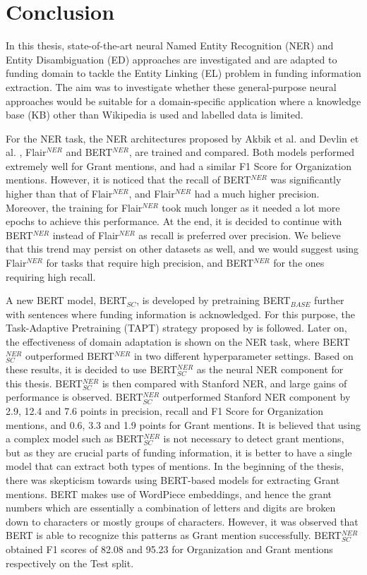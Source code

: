 \documentclass{report}
\theoremstyle{definition}
\theoremstyle{remark}
\begin{document}
\chapter{Conclusion}
\label{chapter:Conclusion}
In this thesis, state-of-the-art neural Named Entity Recognition (NER) and Entity Disambiguation (ED) approaches are investigated and are adapted to funding domain to tackle the Entity Linking (EL) problem in funding information extraction. The aim was to investigate whether these general-purpose neural approaches would be suitable for a domain-specific application where a knowledge base (KB) other than Wikipedia is used and labelled data is limited.

For the NER task, the NER architectures proposed by Akbik et al. \cite{flairpaper} and Devlin et al. \cite{BERT}, Flair$^{NER}$ and BERT$^{NER}$, are trained and compared. Both models performed extremely well for Grant mentions, and had a similar F1 Score for Organization mentions. However, it is noticed that the recall of BERT$^{NER}$ was significantly higher than that of Flair$^{NER}$, and Flair$^{NER}$ had a much higher precision. Moreover, the training for Flair$^{NER}$ took much longer as it needed a lot more epochs to achieve this performance. At the end, it is decided to continue with BERT$^{NER}$ instead of Flair$^{NER}$ as recall is preferred over precision. We believe that this trend may persist on other datasets as well, and we would suggest using Flair$^{NER}$ for tasks that require high precision, and BERT$^{NER}$ for the ones requiring high recall.

A new BERT model, BERT$_{SC}$, is developed by pretraining BERT$_{BASE}$ further with sentences where funding information is acknowledged. For this purpose, the Task-Adaptive Pretraining (TAPT) strategy proposed by \cite{DontStop} is followed. Later on, the effectiveness of domain adaptation is shown on the NER task, where BERT$_{SC}^{NER}$ outperformed BERT$^{NER}$ in two different hyperparameter settings. Based on these results, it is decided to use BERT$_{SC}^{NER}$ as the neural NER component for this thesis. BERT$_{SC}^{NER}$ is then compared with Stanford NER, and large gains of performance is observed. BERT$_{SC}^{NER}$ outperformed Stanford NER component by 2.9, 12.4 and 7.6 points in precision, recall and F1 Score for Organization mentions, and 0.6, 3.3 and 1.9 points for Grant mentions. It is believed that using a complex model such as BERT$_{SC}^{NER}$ is not necessary to detect grant mentions, but as they are crucial parts of funding information, it is better to have a single model that can extract both types of mentions. In the beginning of the thesis, there was skepticism towards using BERT-based models for extracting Grant mentions. BERT makes use of WordPiece embeddings, and hence the grant numbers which are essentially a combination of letters and digits are broken down to characters or mostly groups of characters. However, it was observed that BERT is able to recognize this patterns as Grant mention successfully. BERT$_{SC}^{NER}$ obtained F1 scores of 82.08 and 95.23 for Organization and Grant mentions respectively on the Test split.
\end{document}
